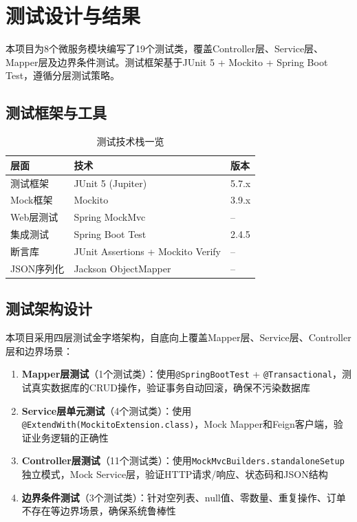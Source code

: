
\chapter{测试设计与结果}

本项目为8个微服务模块编写了19个测试类，覆盖Controller层、Service层、Mapper层及边界条件测试。测试框架基于JUnit 5 + Mockito + Spring Boot Test，遵循分层测试策略。

\section{测试框架与工具}

\begin{table}[H]
	\centering
	\caption{测试技术栈一览}
	\begin{tabular}{p{5.0cm}p{5.0cm}p{4.0cm}}
		\hline
		\textbf{层面} & \textbf{技术} & \textbf{版本} \\
		\hline
		测试框架 & JUnit 5 (Jupiter) & 5.7.x \\
		Mock框架 & Mockito & 3.9.x \\
		Web层测试 & Spring MockMvc & -- \\
		集成测试 & Spring Boot Test & 2.4.5 \\
		断言库 & JUnit Assertions + Mockito Verify & -- \\
		JSON序列化 & Jackson ObjectMapper & -- \\
		\hline
	\end{tabular}
\end{table}

\section{测试架构设计}

本项目采用四层测试金字塔架构，自底向上覆盖Mapper层、Service层、Controller层和边界场景：

\begin{enumerate}
	\item \textbf{Mapper层测试}（1个测试类）：使用\verb|@SpringBootTest| + \verb|@Transactional|，测试真实数据库的CRUD操作，验证事务自动回滚，确保不污染数据库
	\item \textbf{Service层单元测试}（4个测试类）：使用\verb|@ExtendWith(MockitoExtension.class)|，Mock Mapper和Feign客户端，验证业务逻辑的正确性
	\item \textbf{Controller层测试}（11个测试类）：使用\verb|MockMvcBuilders.standaloneSetup|独立模式，Mock Service层，验证HTTP请求/响应、状态码和JSON结构
	\item \textbf{边界条件测试}（3个测试类）：针对空列表、null值、零数量、重复操作、订单不存在等边界场景，确保系统鲁棒性
\end{enumerate}

